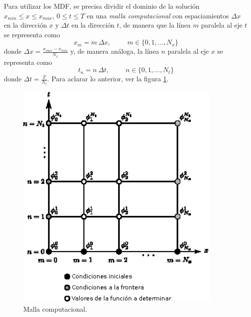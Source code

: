 \documentclass[11pt,twoside,openright,spanish]{report}
\numberwithin{equation}{chapter}
\numberwithin{figure}{chapter}
\numberwithin{table}{chapter}
\begin{document}
Para utilizar los MDF, se precisa dividir el dominio de la solución $x_{min}\leq x\leq x_{max}$, $0\leq t\leq T$ en una \textit{malla computacional} con espaciamientos $\Delta x$ en la dirección $x$ y $\Delta t$ en la dirección $t$, de manera que la línea $m$ paralela al eje $t$ se representa como
\begin{equation}
x_m=m\ \Delta x,\hspace{1cm} m\in\{0,1,\dots,N_x\}
\end{equation}
donde $\Delta x=\frac{x_{max}-x_{min}}{N_x}$ y, de manera análoga, la línea $n$ paralela al eje $x$ se representa como 
\begin{equation}
t_n=n\ \Delta t,\hspace{1cm} n\in\{0,1,\dots,N_t\}
\end{equation}
donde $\Delta t=\frac{T}{N_t}$. Para aclarar lo anterior, ver la figura \ref{grid}.
\begin{figure}[h!]
	\centering
	\includegraphics[height=11.5cm]{malla}
	\caption{Malla computacional.}
	\label{grid}
\end{figure}
\end{document}
